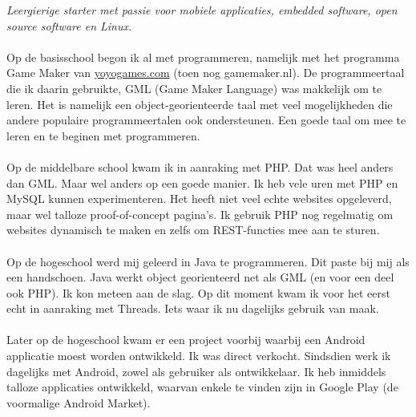\documentclass[10pt,a4paper]{article}
\begin{document}
\vspace{-1.3em}  %
\begin{multicols}{2}  %
\noindent \emph{Leergierige starter met passie voor mobiele applicaties, embedded software, open source software en Linux.}
\\
\\
Op de basisschool begon ik al met programmeren, namelijk met het programma Game Maker van \href{http://www.yoyogames.com}{yoyogames.com} (toen nog gamemaker.nl). De programmeertaal die ik daarin gebruikte, GML (Game Maker Language) was makkelijk om te leren. Het is namelijk een object-georienteerde taal met veel mogelijkheden die andere populaire programmeertalen ook ondersteunen. Een goede taal om mee te leren en te beginen met programmeren.
\\
\\
Op de middelbare school kwam ik in aanraking met PHP. Dat was heel anders dan GML. Maar wel anders op een goede manier. Ik heb vele uren met PHP en MySQL kunnen experimenteren. Het heeft niet veel echte websites opgeleverd, maar wel talloze proof-of-concept pagina's. Ik gebruik PHP nog regelmatig om websites dynamisch te maken en zelfs om REST-functies mee aan te sturen.
\\
\\
Op de hogeschool werd mij geleerd in Java te programmeren. Dit paste bij mij als een handschoen. Java werkt object georienteerd net als GML (en voor een deel ook PHP). Ik kon meteen aan de slag. Op dit moment kwam ik voor het eerst echt in aanraking met Threads. Iets waar ik nu dagelijks gebruik van maak.
\\
\\
Later op de hogeschool kwam er een project voorbij waarbij een Android applicatie moest worden ontwikkeld. Ik was direct verkocht.
Sindsdien werk ik dagelijks met Android, zowel als gebruiker als ontwikkelaar.
Ik heb inmiddels talloze applicaties ontwikkeld, waarvan enkele te vinden zijn in Google Play (de voormalige Android Market).
\end{multicols}

\spacedhrule{0em}{-0.4em}

\end{document}
